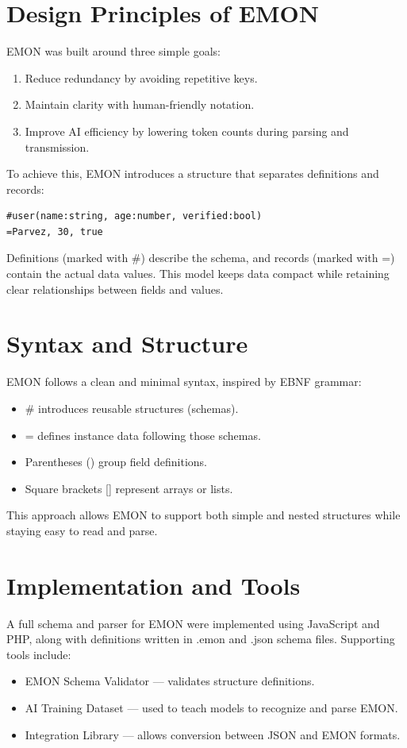 \documentclass[12pt,a4paper]{article}
\begin{document}
\section{Design Principles of EMON}
EMON was built around three simple goals:
\begin{enumerate}
    \item Reduce redundancy by avoiding repetitive keys.
    \item Maintain clarity with human-friendly notation.
    \item Improve AI efficiency by lowering token counts during parsing and transmission.
\end{enumerate}

To achieve this, EMON introduces a structure that separates definitions and records:
\begin{lstlisting}[language={},frame=single]
#user(name:string, age:number, verified:bool)
=Parvez, 30, true
\end{lstlisting}

Definitions (marked with \#) describe the schema, and records (marked with =) contain the actual data values. This model keeps data compact while retaining clear relationships between fields and values.

\section{Syntax and Structure}
EMON follows a clean and minimal syntax, inspired by EBNF grammar:
\begin{itemize}
    \item \# introduces reusable structures (schemas).
    \item = defines instance data following those schemas.
    \item Parentheses () group field definitions.
    \item Square brackets [] represent arrays or lists.
\end{itemize}

This approach allows EMON to support both simple and nested structures while staying easy to read and parse.

\section{Implementation and Tools}
A full schema and parser for EMON were implemented using JavaScript and PHP, along with definitions written in .emon and .json schema files. Supporting tools include:
\begin{itemize}
    \item EMON Schema Validator --- validates structure definitions.
    \item AI Training Dataset --- used to teach models to recognize and parse EMON.
    \item Integration Library --- allows conversion between JSON and EMON formats.
\end{itemize}
\end{document}
